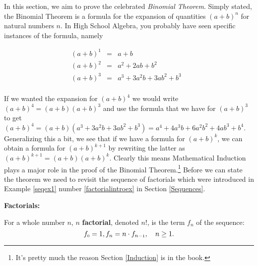 \documentclass{ximera}
\begin{document}
	\author{Stitz-Zeager}




\setcounter{footnote}{0}

\label{Binomial}

In this section, we aim to prove the celebrated \textit{Binomial Theorem}.  Simply stated, the Binomial Theorem is a formula for the expansion of quantities $(a+b)^n$ for natural numbers $n$.  In High School Algebra, you probably have seen specific instances of the formula, namely

\[ \begin{array}{rclr}

(a+b)^1 & = & a + b & \\
(a+b)^2 & = & a^2 + 2ab + b^2 & \\
(a+b)^3 & = & a^3 + 3a^2 b + 3ab^2 + b^3 & \\
\end{array}\]

If we wanted the expansion for $(a+b)^4$ we would write $(a+b)^4 = (a+b)(a+b)^3$ and use the formula that we have for $(a+b)^3$ to get $(a+b)^4 = (a+b) \left( a^3 + 3a^2 b + 3ab^2 + b^3 \right) = a^4 + 4a^3b + 6a^2b^2 + 4ab^3 + b^4$.  Generalizing this a bit, we see that if we have a formula for $(a+b)^{k}$, we can obtain a formula for $(a+b)^{k+1}$ by rewriting the latter as $(a+b)^{k+1} = (a+b)(a+b)^{k}$.  Clearly this means Mathematical Induction plays a major role in the proof of the Binomial Theorem.\footnote{It's pretty much the reason Section \ref{Induction} is in the book.}  Before we can state the theorem we need to revisit the sequence of factorials which were introduced in Example \ref{seqex1} number \ref{factorialintroex} in Section \ref{Sequences}.

\medskip


\begin{definition}  \label{factorialdefn}  \textbf{Factorials:}  

For a whole number $n$,  {\boldmath $n$} \textbf{factorial}, denoted $n!$,  is the term $f_{n}$ of the sequence: \[ f_{\mbox{\tiny$0$}} = 1, f_{n} =n \cdot f_{n-\mbox{\tiny$1$}}, \quad n \geq 1.\]


\end{definition}



\medskip
\end{document}
